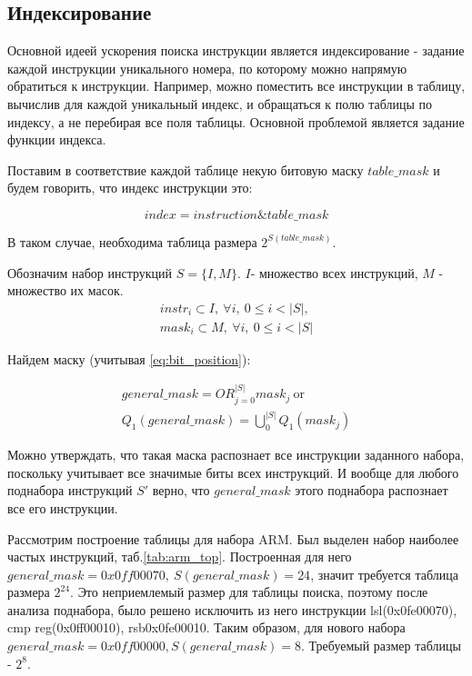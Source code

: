 \subsection{Индексирование}
Основной идеей ускорения поиска инструкции является индексирование - задание каждой инструкции уникального номера, по которому можно напрямую обратиться к инструкции. Например, можно поместить все инструкции в таблицу, вычислив для каждой уникальный индекс, и обращаться к полю таблицы по индексу, а не перебирая все поля таблицы. Основной проблемой является задание функции индекса. 

Поставим в соответствие каждой таблице некую битовую маску $table\_mask$ и будем говорить, что индекс инструкции это:

\begin{equation}
	index = instruction \& table\_mask
\end{equation}

В таком случае, необходима таблица размера $2^{S(table\_mask)}$.

Обозначим набор инструкций $S=\{I, M\}$. $I$- множество всех инструкций, $M$ - множество их масок.
\begin{eqnarray*}
	instr_i \subset I,\ \forall i,\ 0 \le i < |S|, \\
	mask_i \subset M,\ \forall i,\ 0 \le i < |S|
\end{eqnarray*}

Найдем маску (учитывая \ref{eq:bit_position}):

\begin{eqnarray} \label{eq:general_mask}
	general\_mask = OR_{j=0}^{|S|}mask_j\ \text{or}\nonumber \\
	Q_1(general\_mask)=\bigcup_{0}^{|S|}Q_1(mask_j)
\end{eqnarray}

Можно утверждать, что такая маска распознает все инструкции заданного набора, поскольку учитывает все значимые биты всех инструкций. И вообще для любого поднабора инструкций $S'$ верно, что $general\_mask$ этого поднабора распознает все его инструкции.

Рассмотрим построение таблицы для набора ARM. Был выделен набор наиболее частых инструкций, таб.\ref{tab:arm_top}. Построенная для него $general\_mask=0x0ff00070,\ S(general\_mask)=24$, значит требуется таблица размера $2^{24}$. Это неприемлемый размер для таблицы поиска, поэтому после анализа поднабора, было решено исключить из него инструкции lsl(0x0fe00070), cmp reg(0x0ff00010), rsb{0x0fe00010}. Таким образом, для нового набора $general\_mask=0x0ff00000, S(general\_mask)=8$. Требуемый размер таблицы - $2^8$.  

